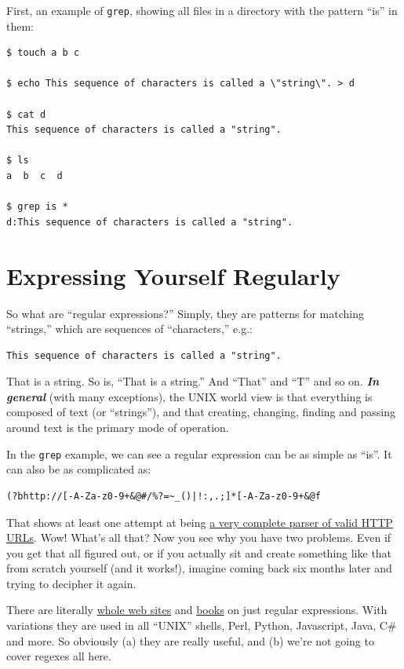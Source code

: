 \documentclass[10pt,]{book}
\numberwithin{figure}{chapter}
\begin{document}
First, an example of \texttt{grep}, showing all files in a directory
with the pattern ``is'' in them:

\begin{verbatim}
$ touch a b c

$ echo This sequence of characters is called a \"string\". > d

$ cat d
This sequence of characters is called a "string".

$ ls
a  b  c  d

$ grep is *
d:This sequence of characters is called a "string".
\end{verbatim}

\section{Expressing Yourself
Regularly}\label{expressing-yourself-regularly}

So what are ``regular expressions?'' Simply, they are patterns for
matching ``strings,'' which are sequences of ``characters,'' e.g.:

\begin{verbatim}
This sequence of characters is called a "string".
\end{verbatim}

That is a string. So is, ``That is a string.'' And ``That'' and ``T''
and so on. \textbf{\emph{In general}} (with many exceptions), the UNIX
world view is that everything is composed of text (or ``strings''), and
that creating, changing, finding and passing around text is the primary
mode of operation.

In the \texttt{grep} example, we can see a regular expression can be as
simple as ``is''. It can also be as complicated as:

\begin{verbatim}
(?bhttp://[-A-Za-z0-9+&@#/%?=~_()|!:,.;]*[-A-Za-z0-9+&@f
\end{verbatim}

That shows at least one attempt at being
\href{http://blog.codinghorror.com/the-problem-with-urls/}{a very
complete parser of valid HTTP URLs}. Wow! What's all that? Now you see
why you have two problems. Even if you get that all figured out, or if
you actually sit and create something like that from scratch yourself
(and it works!), imagine coming back six months later and trying to
decipher it again.

There are literally \href{http://www.regular-expressions.info/}{whole
web sites} and
\href{http://shop.oreilly.com/product/9781565922570.do}{books} on just
regular expressions. With variations they are used in all ``UNIX''
shells, Perl, Python, Javascript, Java, C\# and more. So obviously (a)
they are really useful, and (b) we're not going to cover regexes all
here.
\end{document}
